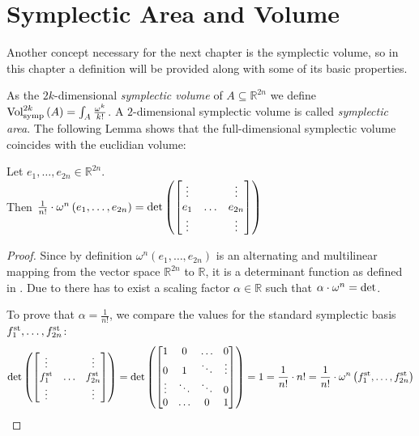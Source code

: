 \documentclass[../SymplecticSimplices.tex]{subfiles}
\begin{document}
\section{Symplectic Area and Volume}

Another concept necessary for the next chapter is the symplectic volume, so in this chapter a definition will be provided along with some of its basic properties.

As the \(2k\)-dimensional \textit{symplectic volume} of \( A \subseteq \mathbb{R}^{2n} \) we define \( \textnormal{Vol}^{2k}_\textnormal{symp} \left( A \right) = \int_{A} \frac{\omega^k}{k!} \). A \( 2 \)-dimensional symplectic volume is called \textit{symplectic area}. The following Lemma shows that the full-dimensional symplectic volume coincides with the euclidian volume:

\begin{lemma}
  \label{lemma:symplecticvolume}
  Let \( e_1, \dots, e_{2n} \in \mathbb{R}^{2n} \).\\
  Then \( \frac{1}{n!} \cdot \omega^{n} \left( e_1, \dots, e_{2n} \right) = \textnormal{det} \left(
\begin{bmatrix}
  \vdots & &\vdots \\
  e_1 & \dots & e_{2n}\\
 \vdots & & \vdots
\end{bmatrix}
  \right) \)
\end{lemma}

\begin{proof}
  Since by definition \( \omega^{n} \left( e_1, \dots, e_{2n} \right) \) is an alternating and multilinear mapping from the vector space \( \mathbb{R}^{2n} \) to \( \mathbb{R} \), it is a determinant function as defined in \cite[Section 4.3, Definition 1]{bosch}. Due to \cite[Section 4.3, Lemma 9]{bosch} there has to exist a scaling factor \( \alpha \in \mathbb{R} \) such that \( \alpha \cdot \omega^{n} = \textnormal{det} \).

  To prove that \( \alpha = \frac{1}{n!} \), we compare the values for the standard symplectic basis \( f^{\textnormal{st}}_1, \dots, f^{\textnormal{st}}_{2n} \): \[ \textnormal{det} \left(
\begin{bmatrix}
  \vdots & &\vdots \\
  f^{\textnormal{st}}_1 & \dots & f^{\textnormal{st}}_{2n}\\
 \vdots & & \vdots
\end{bmatrix}
\right)= \textnormal{det} \left(
\begin{bmatrix}
  1 & 0 & \dots & 0 \\
  0 & 1 & \ddots & \vdots \\
  \vdots & \ddots & \ddots & 0 \\
  0 & \dots & 0 & 1 \\
\end{bmatrix}
\right) = 1 = \frac{1}{n!} \cdot n! = \frac{1}{n!} \cdot \omega^{n} \left( f^{\textnormal{st}}_1, \dots, f^{\textnormal{st}}_{2n} \right)
  \]
\end{proof}
\end{document}
